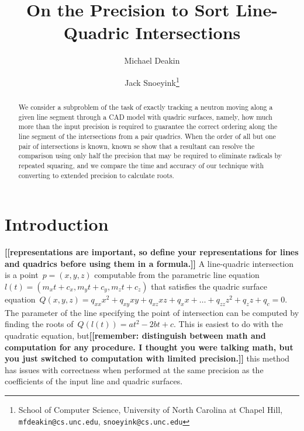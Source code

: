 \documentclass{cccg16}
\title{On the Precision to Sort Line-Quadric Intersections}
\author{Michael Deakin \and Jack Snoeyink\thanks{School of Computer
    Science, University of North Carolina at Chapel Hill, {\tt
      mfdeakin@cs.unc.edu}, {\tt snoeyink@cs.unc.edu}}}
\def\Jack#1{{\bf [[#1]]}\ignorespaces}
\begin{document}
\thispagestyle{empty}
\maketitle

\begin{abstract}
  We consider a subproblem of the task of exactly tracking a neutron
  moving along a given line segment through a CAD model with quadric
  surfaces, namely, how much more than the input precision is required
  to guarantee the correct ordering along the line segment of the
  intersections from a pair quadrics.  When the order of all but one
  pair of intersections is known, known se show that a resultant can
  resolve the comparison using only half the precision that may be
  required to eliminate radicals by repeated squaring, and we compare
  the time and accuracy of our technique with converting to extended
  precision to calculate roots.
  

\end{abstract}

\section{Introduction}
\Jack{representations are important, so define your representations for lines and quadrics before using them in a formula.} 
A line-quadric intersection is a point~$p=(x, y, z)$ computable from
the parametric line equation $l(t)=(m_x t + c_x, m_y t + c_y, m_z t +
c_z)$ that satisfies the quadric surface equation~$Q(x, y, z)=q_{xx}
x^2 + q_{xy} xy + q_{xz} xz + q_x x + \dots + q_{zz} z^2 + q_{z} z +
q_c = 0$.  The parameter of the line specifying the point of
intersection can be computed by finding the roots of~$Q(l(t))=a t^2 -
2 b t + c$.  This is easiest to do with the quadratic equation, but\Jack{remember: distinguish between math and computation for any procedure. I thought you were talking math, but you just switched to computation with limited precision.}
this method has issues with correctness when performed at the same
precision as the coefficients of the input line and quadric surfaces.
\end{document}

